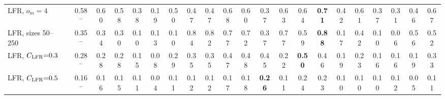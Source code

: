 \begin{table}[p]
{\begin{tabular}{llcccc|cc|cccccc|cccccccc}
LFR, $o_m{=}4$ &  & 0.58$^{-}$ & 0.60 & 0.58 & 0.38 & 0.19 & 0.50 & 0.47 & 0.47 & 0.68 & 0.60 & 0.37 & 0.63 & 0.64 & \textbf{0.71} & 0.42 & 0.61 & 0.37 & 0.31 & 0.46 & 0.67 \\
LFR, sizes 50--250 &  & 0.35$^{-}$ & 0.34 & 0.30 & 0.10 & 0.13 & 0.10 & 0.84 & 0.82 & 0.77 & 0.72 & 0.37 & 0.77 & 0.59 & \textbf{0.88} & 0.17 & 0.42 & 0.10 & 0.06 & 0.56 & 0.52 \\
LFR, $C_{\rm LFR}{=}0.3$ &  & 0.28$^{-}$ & 0.28 & 0.28 & 0.15 & 0.08 & 0.29 & 0.35 & 0.35 & 0.47 & 0.48 & 0.45 & 0.22 & \textbf{0.50} & 0.46 & 0.19 & 0.23 & 0.16 & 0.16 & 0.19 & 0.33 \\
LFR, $C_{\rm LFR}{=}0.5$ &  & 0.16$^{-}$ & 0.16 & 0.15 & 0.11 & 0.04 & 0.11 & 0.12 & 0.12 & 0.17 & 0.18 & \textbf{0.26} & 0.11 & 0.24 & 0.23 & 0.10 & 0.10 & 0.10 & 0.12 & 0.05 & 0.11 \\
\hline\hline
\end{tabular}}
\end{table}

